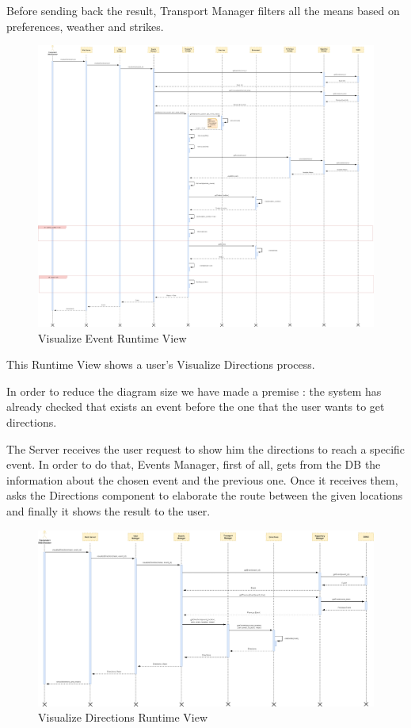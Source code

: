 Before sending back the result, Transport Manager filters all the means based on preferences, weather and strikes.
\begin{figure}[H]
	\centering
	\includegraphics[scale=0.125]{Images/Runtime/Visualize_Event}
	\caption{Visualize Event Runtime View}
\end{figure}

\newpage
{}
This Runtime View shows a user's Visualize Directions process.\par
In order to reduce the diagram size we have made a premise : the system has already checked that exists an event before the one that the user wants to get directions.\par
The Server receives the user request to show him the directions to reach a specific event. In order to do that, Events Manager, first of all, gets from the DB the information about the chosen event and the previous one. Once it receives them, asks the Directions component to elaborate the route between the given locations and finally it shows the result to the user.
\begin{figure}[H]
	\centering
	\includegraphics[scale=0.16]{Images/Runtime/Visualize_Directions}
	\caption{Visualize Directions Runtime View}
\end{figure}

